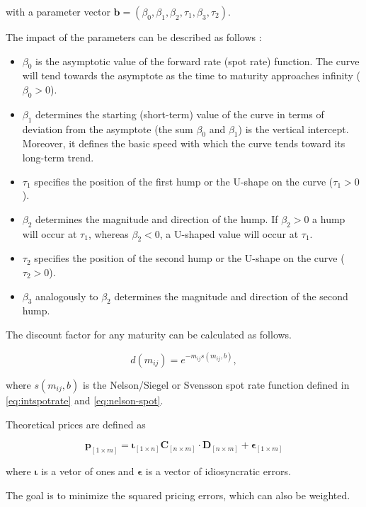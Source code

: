 with a parameter vector ${\bm{b}} = \left(\beta_0,\beta_1,\beta_2,\tau_1,\beta_3,\tau_2\right)$.

The impact of the parameters can be described as follows \citep[see][p.7]{Bolder1999}:

\begin{itemize}
\item $\beta_0$ is the asymptotic value of the forward rate (spot rate) function.  The curve will tend towards the asymptote as the time to maturity approaches  infinity ($\beta_0 >0$).
\item $\beta_1$ determines the starting (short-term) value of the curve in terms of deviation from the asymptote (the sum $\beta_0$ and $\beta_1$) is the vertical intercept. Moreover, it defines the basic speed with which the curve tends toward its long-term trend.
\item $\tau_1$ specifies the position of the first hump or the U-shape on the curve ($\tau_1>0$).
\item $\beta_2$ determines the magnitude and direction of the hump. If $\beta_2 >0$  a hump will occur at  $\tau_1$, whereas $\beta_2<0$, a U-shaped value will occur at $\tau_1$.
\item $\tau_2$ specifies the position of the second hump or the U-shape on the curve ($\tau_2>0$).
\item $\beta_3$ analogously  to  $\beta_2$ determines the magnitude and direction of the second hump.
\end{itemize}


The discount factor for any maturity can be calculated as follows. 

\begin{displaymath}
d(m_{ij})=e^{-m_{ij}s(m_{ij},b)},
\end{displaymath}

where $s(m_{ij},b)$ is the Nelson/Siegel or Svensson spot rate function defined in \eqref{eq:intspotrate} and \eqref{eq:nelson-spot}.

Theoretical prices are defined as

\begin{equation}
  \label{eq:theorprices}
  \bm{p}_{[1\times m]} = \bm{\iota}_{[1\times n]}\bm{C}_{[n\times m]}\cdot\bm{D}_{[n\times m]}+\bm{\epsilon}_{[1\times m]}
\end{equation}

where $\bm{\iota}$ is a vetor of ones and  $\bm{\epsilon}$ is a vector of idiosyncratic errors.

The goal is to minimize the squared pricing errors, which can also be weighted.

